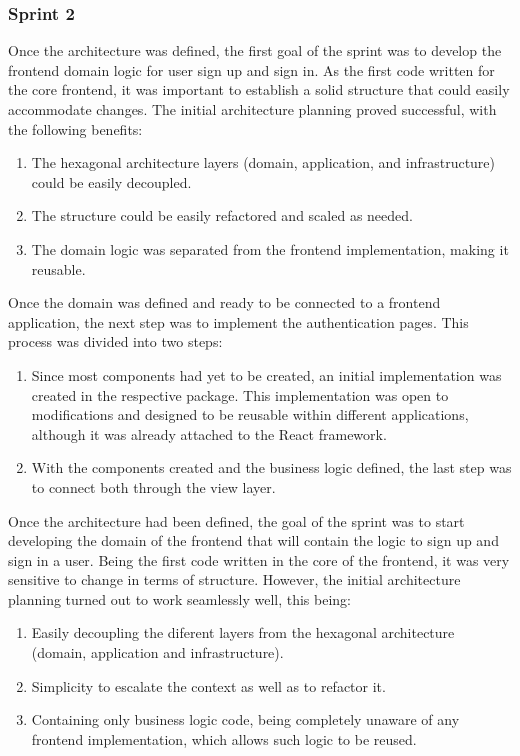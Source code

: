\documentclass[../memory.tex]{subfiles}
\begin{document}
\subsubsection{Sprint 2}
Once the architecture was defined, the first goal of the sprint was to develop
the frontend domain logic for user sign up and sign in. As the first code
written for the core frontend, it was important to establish a solid structure
that could easily accommodate changes. The initial architecture planning proved
successful, with the following benefits:
\begin{enumerate}[label = -]
	\item The hexagonal architecture layers (domain, application, and
	      infrastructure) could be easily decoupled.
	\item The structure could be easily refactored and scaled as needed.
	\item The domain logic was separated from the frontend implementation, making
	      it reusable.
\end{enumerate}
Once the domain was defined and ready to be connected to a frontend application,
the next step was to implement the authentication pages. This process was
divided into two steps:
\begin{enumerate}[label = \arabic{*}.]
	\item Since most components had yet to be created, an initial implementation
	      was created in the respective package. This implementation was open to
	      modifications and designed to be reusable within different applications,
	      although it was already attached to the React framework.
	\item With the components created and the business logic defined, the last
	      step was to connect both through the view layer.
\end{enumerate}
Once the architecture had been defined, the goal of the sprint was to start
developing the domain of the frontend that will contain the logic to sign up and
sign in a user. Being the first code written in the core of the frontend, it was
very sensitive to change in terms of structure. However, the initial
architecture planning turned out to work seamlessly well, this being:
\begin{enumerate}[label = -]
	\item Easily decoupling the diferent layers from the hexagonal architecture
	      (domain, application and infrastructure).
	\item Simplicity to escalate the context as well as to refactor it.
	\item Containing only business logic code, being completely unaware of any
	      frontend implementation, which allows such logic to be reused.
\end{enumerate}
\end{document}

